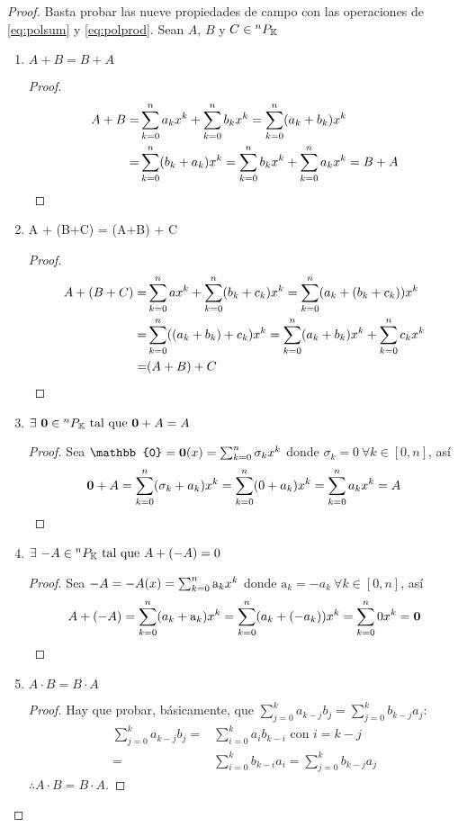 \begin{proof}
Basta probar las nueve propiedades de campo con las operaciones de \ref{eq:polsum} y \ref{eq:polprod}.
Sean $A$, $B$ y $C \in {^{n}P_{\mathbb{K}}}$
\begin{enumerate}

 \item $ A + B = B + A $
 \begin{proof}
  \begin{align*}
   A + B =& \sum_{k=0}^n a_k x^k + \sum_{k=0}^n b_k x^k  = \sum_{k=0}^n (a_k + b_k) x^k \\ 
   =& \sum_{k=0}^n (b_k + a_k) x^k = \sum_{k=0}^n b_k x^k +     \sum_{k=0}^n a_k x^k = B + A
  \end{align*}
 \end{proof}
 
 \item A + (B+C) = (A+B) + C
 \begin{proof}
  \begin{align*}
   A + (B+C) =& \sum_{k=0}^n a x^k + \sum_{k=0}^n (b_k+c_k) x^k = \sum_{k=0}^n (a_k + (b_k + c_k)) x^k \\
   =&  \sum_{k=0}^n ((a_k + b_k) + c_k) x^k = \sum_{k=0}^n (a_k+b_k) x^k + \sum_{k=0}^n c_k x^k \\
   =& (A+B) + C 
  \end{align*}
 \end{proof}
 
 \item $\exists \  \bm{0} \in {^{n}P_{\mathbb{K}}} \text{ tal que }  \bm{0} + A = A $
 \begin{proof}
 Sea $\mathbb{0} = \bm{0}(x) = \polk{\sigma_k}$ donde $\sigma_k = 0 \ \forall k \in [0,n]$, así 
  \begin{align*}
  \bm{0} + A = \sum_{k=0}^n (\sigma_k + a_k) x^k = \sum_{k=0}^n (0 + a_k) x^k = \sum_{k=0}^n a_k x^k = A
  \end{align*}
 \end{proof}
 
 \item $\exists \ {-A} \in{^{n}P_{\mathbb{K}}}  \text{ tal que } A + (-A) = 0 $
 \begin{proof}
 Sea $-A = -A(x) = \sum_{k=0}^n \mathrm{a}_k x^k$ donde $\mathrm{a}_k = -a_k \ \forall k \in [0,n]$, así
  \begin{align*}
   A + (-A) = \sum_{k=0}^n (a_k + \mathrm{a}_k) x^k = \sum_{k=0}^n (a_k + (-a_k)) x^k = \sum_{k=0}^n 0 x^k = \bm{0}
  \end{align*}
 \end{proof}
 
 \item $ A\cdot B = B\cdot A $
 \begin{proof}
 Hay que probar, básicamente, que $\sum_{j=0}^k{a_{k-j}b_j} = \sum_{j=0}^k{b_{k-j}a_j}$:
  \begin{align*} 
   \sum_{j=0}^k{a_{k-j}b_j} =& \sum_{i=0}^k{a_ib_{k-i}} \text{ con } i = k - j \\
   =& \sum_{i=0}^k{ b_{k-i}a_i } = \sum_{j=0}^k { b_{k-j}a_j }
  \end{align*}
  $\therefore A\cdot B = B\cdot A$.
 \end{proof}
 

\end{enumerate}
\end{proof}
